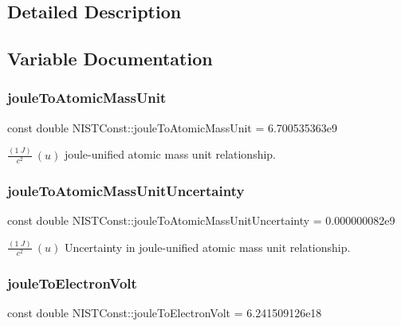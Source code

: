 \subsection{Detailed Description}


\subsection{Variable Documentation}
\mbox{\label{group___joule_ga6a8cba6b834ee62ab61671208b1ae9ee}} 
\subsubsection{\texorpdfstring{joule\+To\+Atomic\+Mass\+Unit}{jouleToAtomicMassUnit}}
{\footnotesize\ttfamily const double N\+I\+S\+T\+Const\+::joule\+To\+Atomic\+Mass\+Unit = 6.\+700535363e9}

$\frac{(1\ J)}{c^2} \ (u)$ joule-\/unified atomic mass unit relationship. \mbox{\label{group___joule_ga0fcd1cd8572c48695fadec809a5a1225}} 
\subsubsection{\texorpdfstring{joule\+To\+Atomic\+Mass\+Unit\+Uncertainty}{jouleToAtomicMassUnitUncertainty}}
{\footnotesize\ttfamily const double N\+I\+S\+T\+Const\+::joule\+To\+Atomic\+Mass\+Unit\+Uncertainty = 0.\+000000082e9}

$\frac{(1\ J)}{c^2} \ (u)$ Uncertainty in joule-\/unified atomic mass unit relationship. \mbox{\label{group___joule_ga08ffcdfd701ba898a91b0cbdde4d0e2d}} 
\subsubsection{\texorpdfstring{joule\+To\+Electron\+Volt}{jouleToElectronVolt}}
{\footnotesize\ttfamily const double N\+I\+S\+T\+Const\+::joule\+To\+Electron\+Volt = 6.\+241509126e18}


